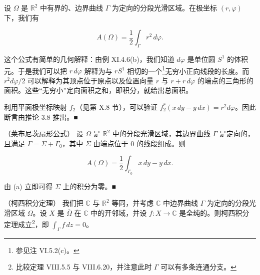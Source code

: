 \begin{example}

\begin{items}
\item

设 $ \Omega $ 是 $ \mathbb{R}^2 $ 中有界的、边界曲线 $ \Gamma $ 为定向的分段光滑区域。在极坐标 $ (r,\varphi) $ 下，我们有

\[
A(\Omega) = \frac{1}{2}\int_{\Gamma} r^2\,d\varphi .
\]

这个公式有简单的几何解释：由例 XI.4.6(b)，我们知道 $ d\varphi $ 是单位圆 $ S^1 $ 的体积元。于是我们可以把 $ r\,d\varphi $ 解释为与 $ rS^1 $ 相切的一个\footnote{参见注 VI.5.2(c)。}无穷小正向线段的长度。而 $ r^2 d\varphi/2 $ 可以解释为其顶点位于原点以及位置向量 $ r $ 与 $ r+r\,d\varphi $ 的端点的三角形的面积。这些“无穷小”定向面积之和，即积分，就给出总面积。

\end{items}


\proofhead
利用平面极坐标映射 $ f_2 $（见第 X.8 节），可以验证 $ f_2^*(x\,dy - y\,dx) = r^2 d\varphi $。因此断言由推论 3.8 推出。\nobreak\hspace{0.35em}■

\begin{items}
\item[（b）]

（莱布尼茨扇形公式） 设 $ \Omega $ 是 $ \mathbb{R}^2 $ 中的分段光滑区域，其边界曲线 $ \Gamma $ 是定向的，且满足 $ \Gamma = \Sigma+\Gamma_0 $，其中 $ \Sigma $ 由端点位于 $ 0 $ 的线段组成。则

\[
A(\Omega) = \frac{1}{2}\int_{\Gamma_0} x\,dy - y\,dx .
\]
\end{items}


\proofhead
由 (a) 立即可得 $ \Sigma $ 上的积分为零。\nobreak\hspace{0.35em}■

\begin{items}
\item[（c）]

（柯西积分定理） 我们把 $ \mathbb{C} $ 与 $ \mathbb{R}^2 $ 等同，并考虑 $ \mathbb{C} $ 中边界曲线 $ \Gamma $ 为定向的分段光滑区域 $ \Omega $。设 $ X $ 是 $ \overline{\Omega} $ 在 $ \mathbb{C} $ 中的开邻域，并设 $ f: X\to\mathbb{C} $ 是全纯的。则柯西积分定理成立\footnote{比较定理 VIII.5.5 与 VIII.6.20，并注意此时 $ \Gamma $ 可以有多条连通分支。}，即 $ \int_{\Gamma} f\,dz = 0 $。


\end{items}
\end{example}
